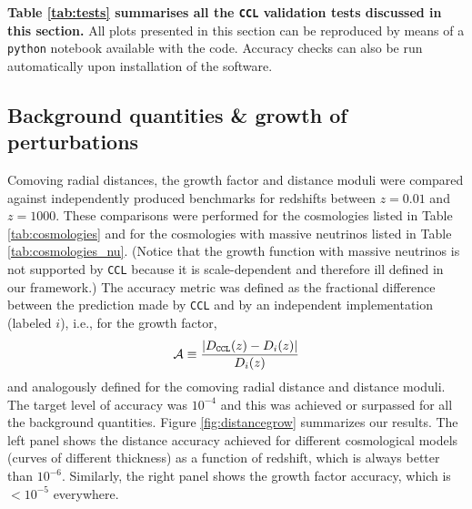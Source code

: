 \documentclass[\docopts]{\docclass}
\newcommand{\ccl}{{\tt CCL}\xspace}
\begin{document}


{\bf Table \ref{tab:tests} summarises all the \ccl validation tests discussed in this section.} All plots presented in this section can be reproduced by means of a {\tt python} notebook available with the code. Accuracy checks can also be run automatically upon installation of the software.

\subsection{Background quantities \& growth of perturbations}

Comoving radial distances, the growth factor and distance moduli were compared against independently produced benchmarks for redshifts between $z = 0.01$ and $z = 1000$. These comparisons were performed for the cosmologies listed in Table \ref{tab:cosmologies} and for the cosmologies with massive neutrinos listed in Table \ref{tab:cosmologies_nu}. (Notice that the growth function with massive neutrinos is not supported by \ccl because it is scale-dependent and therefore ill defined in our framework.) The accuracy metric was defined as the fractional difference between the prediction made by \ccl and by an independent implementation (labeled $i$), i.e., for the growth factor,
\begin{equation}
  \mathcal{A} \equiv \frac{|D_{\tt CCL}(z)-D_{i}(z)|}{D_i(z)}
\end{equation}
and analogously defined for the comoving radial distance and distance moduli.
The target level of accuracy was $10^{-4}$ and this was achieved or surpassed for all the background quantities. Figure \ref{fig:distancegrow} summarizes our results. The left panel shows the distance accuracy achieved for different cosmological models (curves of different thickness) as a function of redshift, which is always better than $10^{-6}$. Similarly, the right panel shows the growth factor accuracy, which is $<10^{-5}$ everywhere.


\end{document}
